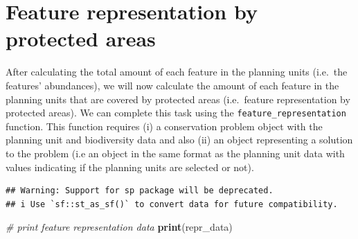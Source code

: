 \documentclass[12pt,]{book}
\newenvironment{Shaded}{\begin{snugshade}}{\end{snugshade}}
\newcommand{\CommentTok}[1]{\textcolor[rgb]{0.56,0.35,0.01}{\textit{#1}}}
\newcommand{\KeywordTok}[1]{\textcolor[rgb]{0.13,0.29,0.53}{\textbf{#1}}}
\newcommand{\NormalTok}[1]{#1}
\newcommand{\OperatorTok}[1]{\textcolor[rgb]{0.81,0.36,0.00}{\textbf{#1}}}
\newcommand{\StringTok}[1]{\textcolor[rgb]{0.31,0.60,0.02}{#1}}
\begin{document}
\hypertarget{feature-representation-by-protected-areas}{%
\section{Feature representation by protected areas}\label{feature-representation-by-protected-areas}}

After calculating the total amount of each feature in the planning units (i.e.~the features' abundances), we will now calculate the amount of each feature in the planning units that are covered by protected areas (i.e.~feature representation by protected areas). We can complete this task using the \texttt{feature\_representation} function. This function requires (i) a conservation problem object with the planning unit and biodiversity data and also (ii) an object representing a solution to the problem (i.e an object in the same format as the planning unit data with values indicating if the planning units are selected or not).

\begin{Shaded}
\end{Shaded}

\begin{verbatim}
## Warning: Support for sp package will be deprecated.
## i Use `sf::st_as_sf()` to convert data for future compatibility.
\end{verbatim}

\begin{Shaded}
\begin{Highlighting}[]
\CommentTok{# print feature representation data}
\KeywordTok{print}\NormalTok{(repr_data)}
\end{Highlighting}
\end{Shaded}
\end{document}
